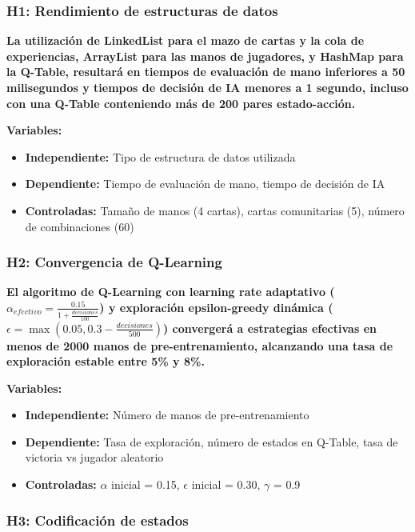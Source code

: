\documentclass[12pt,a4paper]{article}
\begin{document}
\subsubsection{H1: Rendimiento de estructuras de datos}

\textbf{La utilización de LinkedList para el mazo de cartas y la cola de experiencias, ArrayList para las manos de jugadores, y HashMap para la Q-Table, resultará en tiempos de evaluación de mano inferiores a 50 milisegundos y tiempos de decisión de IA menores a 1 segundo, incluso con una Q-Table conteniendo más de 200 pares estado-acción.}

\textbf{Variables:}
\begin{itemize}
    \item \textbf{Independiente:} Tipo de estructura de datos utilizada
    \item \textbf{Dependiente:} Tiempo de evaluación de mano, tiempo de decisión de IA
    \item \textbf{Controladas:} Tamaño de manos (4 cartas), cartas comunitarias (5), número de combinaciones (60)
\end{itemize}

\subsubsection{H2: Convergencia de Q-Learning}

\textbf{El algoritmo de Q-Learning con learning rate adaptativo ($\alpha_{efectivo} = \frac{0.15}{1 + \frac{decisiones}{100}}$) y exploración epsilon-greedy dinámica ($\epsilon = \max(0.05, 0.3 - \frac{decisiones}{500})$) convergerá a estrategias efectivas en menos de 2000 manos de pre-entrenamiento, alcanzando una tasa de exploración estable entre 5\% y 8\%.}

\textbf{Variables:}
\begin{itemize}
    \item \textbf{Independiente:} Número de manos de pre-entrenamiento
    \item \textbf{Dependiente:} Tasa de exploración, número de estados en Q-Table, tasa de victoria vs jugador aleatorio
    \item \textbf{Controladas:} $\alpha$ inicial = 0.15, $\epsilon$ inicial = 0.30, $\gamma$ = 0.9
\end{itemize}

\subsubsection{H3: Codificación de estados}
\end{document}
